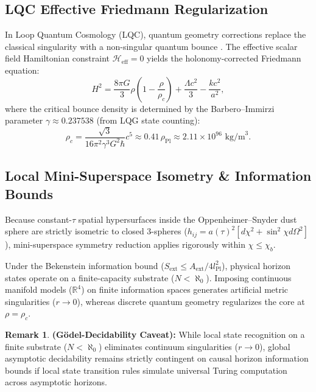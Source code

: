 \documentclass[11pt,a4paper]{article}
\theoremstyle{definition}
\newtheorem{remark}[theorem]{Remark}
\begin{document}
\subsection{LQC Effective Friedmann Regularization}\label{sec:lqc_friedmann}
In Loop Quantum Cosmology (LQC), quantum geometry corrections replace the classical singularity with a non-singular quantum bounce \cite{ashtekar2006, ashtekar2011}. The effective scalar field Hamiltonian constraint $\mathcal{H}_{\text{eff}} = 0$ yields the holonomy-corrected Friedmann equation:
\begin{equation}\label{eq:lqc_friedmann}
    H^2 = \frac{8\pi G}{3}\rho \left(1 - \frac{\rho}{\rho_c}\right) + \frac{\Lambda c^2}{3} - \frac{k c^2}{a^2},
\end{equation}
where the critical bounce density is determined by the Barbero--Immirzi parameter $\gamma \approx 0.237538$ (from LQG state counting):
\begin{equation}\label{eq:critical_density}
    \rho_c = \frac{\sqrt{3}}{16\pi^2 \gamma^3 G^2 \hbar} c^5 \approx 0.41 \, \rho_{\text{Pl}} \approx 2.11 \times 10^{96} \text{ kg/m}^3.
\end{equation}

\subsection{Local Mini-Superspace Isometry \& Information Bounds}\label{sec:minisuperspace}
Because constant-$\tau$ spatial hypersurfaces inside the Oppenheimer--Snyder dust sphere are strictly isometric to closed 3-spheres ($h_{ij} = a(\tau)^2 [d\chi^2 + \sin^2\chi d\Omega^2]$), mini-superspace symmetry reduction applies rigorously within $\chi \le \chi_b$.

Under the Bekenstein information bound ($S_{\text{ext}} \le A_{\text{ext}}/4l_{\text{Pl}}^2$), physical horizon states operate on a finite-capacity substrate ($N < \aleph_0$). Imposing continuous manifold models ($\mathbb{R}^4$) on finite information spaces generates artificial metric singularities ($r \to 0$), whereas discrete quantum geometry regularizes the core at $\rho = \rho_c$.

\begin{remark}\label{rem:godel}
\textbf{(Gödel-Decidability Caveat):} While local state recognition on a finite substrate ($N < \aleph_0$) eliminates continuum singularities ($r \to 0$), global asymptotic decidability remains strictly contingent on causal horizon information bounds if local state transition rules simulate universal Turing computation across asymptotic horizons.
\end{remark}
\end{document}
